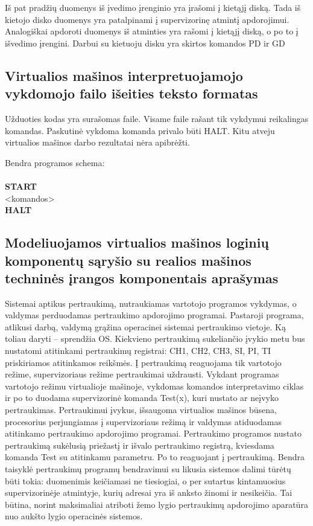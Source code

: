 Iš pat pradžių duomenys iš įvedimo įrenginio yra įrašomi į kietąjį diską. Tada iš kietojo disko duomenys yra patalpinami į supervizorinę atmintį apdorojimui. 
Analogiškai apdoroti duomenys iš atminties yra rašomi į kietąjį diską, o po to į išvedimo įrengini.
Darbui su kietuoju disku yra skirtos komandos PD ir GD

\subsection{Virtualios mašinos interpretuojamojo vykdomojo failo išeities 
teksto formatas}

Užduoties kodas yra surašomas faile. Visame faile rašant tik vykdymui reikalingas
komandas. Paskutinė vykdoma komanda privalo būti HALT. Kitu atveju virtualios mašinos darbo
rezultatai nėra apibrėžti.

Bendra programos schema:\\
\\\textbf{START}\\
<komandos>\\
\textbf{HALT}

\subsection{Modeliuojamos virtualios mašinos loginių komponentų sąryšio su 
realios mašinos techninės įrangos komponentais aprašymas}

Sistemai aptikus pertraukimą, nutraukiamas vartotojo programos vykdymas, o valdymas perduodamas pertraukimo apdorojimo programai. Pastaroji programa, atlikusi darbą, valdymą grąžina operacinei sistemai pertraukimo vietoje.  Ką toliau daryti – sprendžia OS. Kiekvieno pertraukimą sukeliančio įvykio metu bus nustatomi atitinkami pertraukimų registrai: CH1, CH2, CH3, SI, PI, TI priskiriamos atitinkamos reikšmės. 
Į pertraukimą reaguojama tik vartotojo režime, supervizoriaus režime pertraukimai uždrausti. Vykdant programas vartotojo režimu virtualioje mašinoje, vykdomas komandos interpretavimo ciklas ir po to duodama supervizorinė komanda Test(x), kuri  nustato ar neįvyko pertraukimas. 
Pertraukimui įvykus, išsaugoma virtualios mašinos būsena, procesorius perjungiamas į supervizoriaus režimą ir valdymas atiduodamas atitinkamo pertraukimo apdorojimo programai.
Pertraukimo programos nustato pertraukimą sukėlusią priežastį ir išvalo pertraukimo registrą, kviesdama komanda Test su atitinkamu parametru. Po  to reaguojant į pertraukimą.
Bendra taisyklė pertraukimų programų bendravimui su likusia sistemos dalimi tūrėtų būti tokia: duomenimis keičiamasi ne tiesiogiai, o per sutartus kintamuosius supervizorinėje atmintyje, kurių adresai yra iš anksto žinomi ir nesikeičia. Tai būtina, norint maksimaliai atriboti žemo lygio pertraukimų apdorojimo aparatūra nuo aukšto lygio operacinės sistemos.
   

